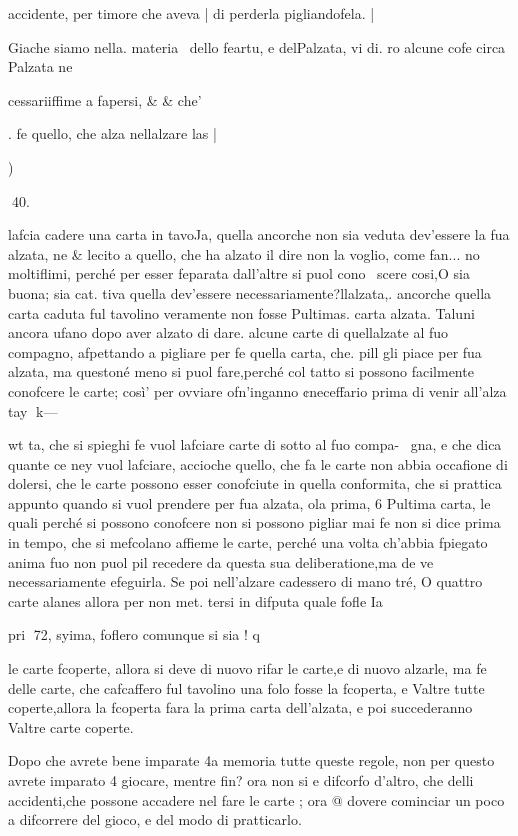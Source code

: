 \documentclass[12pt,a6paper]{article}
\begin{document}
 

 

 

accidente, per timore che aveva |
di perderla pigliandofela. |

Giache siamo nella. materia \
dello feartu, e delPalzata, vi di.
ro alcune cofe circa Palzata ne

 

cessariiffime a fapersi, & & che’

. fe quello, che alza nellalzare
las |

)

 
40.

lafcia cadere una carta in tavoJa, quella ancorche non sia veduta dev’essere la fua alzata, ne
& lecito a quello, che ha alzato
il dire non la voglio, come fan...
no moltiflimi, perché per esser
feparata dall’altre si puol cono~
scere cosi,O sia buona; sia cat.
tiva quella dev’essere necessariamente?llalzata,. ancorche
quella carta caduta ful tavolino
veramente non fosse Pultimas.
carta alzata. Taluni ancora
ufano dopo aver alzato di dare.
alcune carte di quellalzate al
fuo compagno, afpettando a pigliare per fe quella carta, che.
pill gli piace per fua alzata, ma
questoné meno si puol fare,perché col tatto si possono facilmente conofcere le carte; così’
per ovviare ofn’inganno ¢neceffario prima di venir all’alza
tay
k—

wt
ta, che si spieghi fe vuol lafciare carte di sotto al fuo compa-~
gna, e che dica quante ce ney
vuol lafciare, accioche quello,
che fa le carte non abbia occafione di dolersi, che le carte
possono esser conofciute in quella conformita, che si prattica
appunto quando si vuol prendere per fua alzata, ola prima, 6
Pultima carta, le quali perché si
possono conofcere non si possono pigliar mai fe non si dice prima in tempo, che si mefcolano
affieme le carte, perché una
volta ch’abbia fpiegato anima
fuo non puol pil recedere da
questa sua deliberatione,ma de
ve necessariamente efeguirla.
Se poi nell’alzare cadessero
di mano tré, O quattro carte
alanes allora per non met.
tersi in difputa quale fofle Ia

pri
72,
syima, foflero comunque si sia
! q

le carte fcoperte, allora si deve
di nuovo rifar le carte,e di nuovo alzarle, ma fe delle carte,
che cafcaffero ful tavolino una
folo fosse la fcoperta, e Valtre
tutte coperte,allora la fcoperta
fara la prima carta dell’alzata,
e poi succederanno Valtre carte
coperte.

Dopo che avrete bene imparate 4a memoria tutte queste regole, non per questo avrete
imparato 4 giocare, mentre fin?
ora non si e difcorfo d’altro,
che delli accidenti,che possone
accadere nel fare le carte ; ora
@ dovere cominciar un poco a
difcorrere del gioco, e del modo di pratticarlo.
\end{document}
